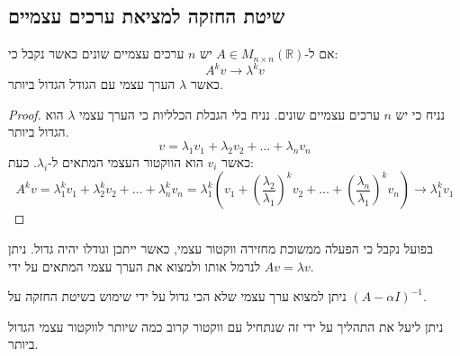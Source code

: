 \documentclass{tstextbook}
\begin{document}
\subsection{שיטת החזקה למציאת ערכים עצמיים}

\begin{proposition}
אם ל-\(A \in M_{n\times n}\left( \mathbb{R} \right)\) יש \(n\) ערכים עצמיים שונים כאשר נקבל כי:
$$A^{k}v\to \lambda^{k}v$$
כאשר \(\lambda\) הערך עצמי עם הגודל הגדול ביותר. 

\end{proposition}
\begin{proof}
נניח כי יש \(n\) ערכים עצמיים שונים. נניח בלי הגבלת הכלליות כי הערך עצמי \(\lambda\) הוא הגדול ביותר.
$$v=\lambda_{1}v_{1}+\lambda_{2}v_{2}+\dots+\lambda_{n}v_{n}$$
כאשר \(v_{i}\) הוא הווקטור העצמי המתאים ל-\(\lambda_{i}\). כעת:
$$A^{k}v=\lambda_{1}^{k}v_{1}+\lambda_{2}^{k}v_{2}+\dots+\lambda_{n}^{k}v_{n}=\lambda_{1}^{k}\left( v_{1}+\left( \frac{\lambda_{2}}{\lambda_{1}} \right)^{k}v_{2}+\dots+\left( \frac{\lambda_{n}}{\lambda_{1}} \right)^{k}v_{n} \right)\to \lambda_{1}^{k}v_{1}$$

\end{proof}
\begin{remark}
בפועל נקבל כי הפעלה ממשוכת מחזירה ווקטור עצמי, כאשר ייתכן וגודלו יהיה גדול. ניתן לנרמל אותו ולמצוא את הערך עצמי המתאים על ידי \(Av=\lambda v\).

\end{remark}
\begin{proposition}
ניתן למצוא ערך עצמי שלא הכי גדול על ידי שימוש בשיטת החזקה על \(\left( A-\alpha I \right) ^{-1}\). 

\end{proposition}
ניתן ליעל את התהליך על ידי זה שנתחיל עם ווקטור קרוב כמה שיותר לווקטור עצמי הגדול ביותר.
\end{document}
